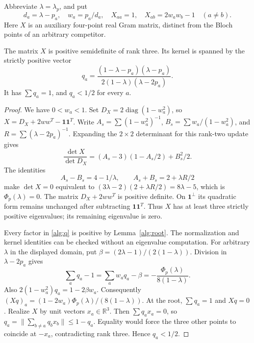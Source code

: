 Abbreviate $\lambda=\lambda_p$, and put
\begin{equation}\label{alg:weights-X}
 d_a=\lambda-p_a,\quad w_a=p_a/d_a,\quad
 X_{aa}=1,\quad X_{ab}=2w_aw_b-1\quad(a\ne b).
\end{equation}
Here $X$ is an auxiliary four-point real Gram matrix, distinct from
the Bloch points of an arbitrary competitor.

\begin{lemma}
\label{alg:bloch}
The matrix $X$ is positive semidefinite of rank three. Its kernel is
spanned by the strictly positive vector
\begin{equation}\label{alg:q}
 q_a=\frac{(1-\lambda-p_a)(\lambda-p_a)}
           {2(1-\lambda)(\lambda-2p_a)}.
\end{equation}
It has $\sum q_a=1$, and $q_a<1/2$ for every $a$.
\end{lemma}
\begin{proof}
We have $0<w_a<1$. Set
$D_X=2\operatorname{diag}(1-w_a^2)$, so
$X=D_X+2ww^T-\mathbf1\mathbf1^T$. Write
$A_s=\sum(1-w_a^2)^{-1}$, $B_s=\sum w_a/(1-w_a^2)$,
and $R=\sum(\lambda-2p_a)^{-1}$. Expanding the $2\times2$ determinant
for this rank-two update gives
\[
 \frac{\det X}{\det D_X}=(A_s-3)(1-A_s/2)+B_s^2/2.
\]
The identities
\[
 A_s-B_s=4-1/\lambda,\qquad A_s+B_s=2+\lambda R/2
\]
make $\det X=0$ equivalent to
$(3\lambda-2)(2+\lambda R/2)=8\lambda-5$, which is
$\Phi_p(\lambda)=0$. The matrix $D_X+2ww^T$ is positive definite.
On $\mathbf1^\perp$ its quadratic form remains unchanged after
subtracting $\mathbf1\mathbf1^T$. Thus $X$ has at least three strictly
positive eigenvalues; its remaining eigenvalue is zero.

Every factor in \eqref{alg:q} is positive by Lemma~\ref{alg:root}.
The normalization and kernel identities can be checked without an
eigenvalue computation. For arbitrary $\lambda$ in the displayed
domain, put $\beta=(2\lambda-1)/(2(1-\lambda))$. Division in
$\lambda-2p_a$ gives
\begin{equation}\label{alg:q-residual}
 \sum_aq_a-1=\sum_aw_aq_a-\beta
       =-\frac{\Phi_p(\lambda)}{8(1-\lambda)}.
\end{equation}
Also $2(1-w_a^2)q_a=1-2\beta w_a$. Consequently
$(Xq)_a=(1-2w_a)\Phi_p(\lambda)/(8(1-\lambda))$.
At the root, $\sum q_a=1$ and $Xq=0$.
Realize $X$ by unit vectors $x_a\in\mathbb R^3$. Then $\sum q_ax_a=0$,
so $q_a=\|\sum_{b\ne a}q_bx_b\|\leq1-q_a$.
Equality would force the three other points to coincide at $-x_a$,
contradicting rank three. Hence $q_a<1/2$.
\end{proof}

